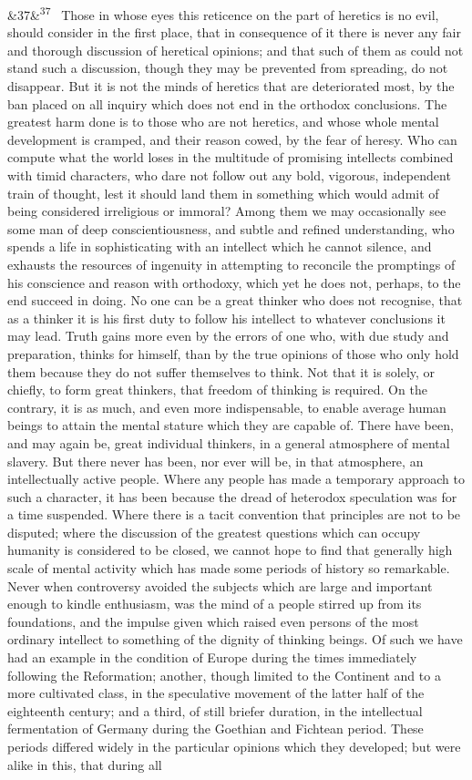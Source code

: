 \documentclass[12pt]{article}
\newcommand{\para}[1][]{\par\noindent\ifx&#1&\else\textsuperscript{\footnotesize #1}~\fi}
\begin{document}
\para[37] Those in whose eyes this reticence on the part of heretics is no evil, should consider in the first place, that in consequence of it there is never any fair and thorough discussion of heretical opinions; and that such of them as could not stand such a discussion, though they may be prevented from spreading, do not disappear. But it is not the minds of heretics that are deteriorated most, by the ban placed on all inquiry which does not end in the orthodox conclusions. The greatest harm done is to those who are not heretics, and whose whole mental development is cramped, and their reason cowed, by the fear of heresy. Who can compute what the world loses in the multitude of promising intellects combined with timid characters, who dare not follow out any bold, vigorous, independent train of thought, lest it should land them in something which would admit of being considered irreligious or immoral? Among them we may occasionally see some man of deep conscientiousness, and subtle and refined understanding, who spends a life in sophisticating with an intellect which he cannot silence, and exhausts the resources of ingenuity in attempting to reconcile the promptings of his conscience and reason with orthodoxy, which yet he does not, perhaps, to the end succeed in doing. No one can be a great thinker who does not recognise, that as a thinker it is his first duty to follow his intellect to whatever conclusions it may lead. Truth gains more even by the errors of one who, with due study and preparation, thinks for himself, than by the true opinions of those who only hold them because they do not suffer themselves to think. Not that it is solely, or chiefly, to form great thinkers, that freedom of thinking is required. On the contrary, it is as much, and even more indispensable, to enable average human beings to attain the mental stature which they are capable of. There have been, and may again be, great individual thinkers, in a general atmosphere of mental slavery. But there never has been, nor ever will be, in that atmosphere, an intellectually active people. Where any people has made a temporary approach to such a character, it has been because the dread of heterodox speculation was for a time suspended. Where there is a tacit convention that principles are not to be disputed; where the discussion of the greatest questions which can occupy humanity is considered to be closed, we cannot hope to find that generally high scale of mental activity which has made some periods of history so remarkable. Never when controversy avoided the subjects which are large and important enough to kindle enthusiasm, was the mind of a people stirred up from its foundations, and the impulse given which raised even persons of the most ordinary intellect to something of the dignity of thinking beings. Of such we have had an example in the condition of Europe during the times immediately following the Reformation; another, though limited to the Continent and to a more cultivated class, in the speculative movement of the latter half of the eighteenth century; and a third, of still briefer duration, in the intellectual fermentation of Germany during the Goethian and Fichtean period. These periods differed widely in the particular opinions which they developed; but were alike in this, that during all 
\end{document}
